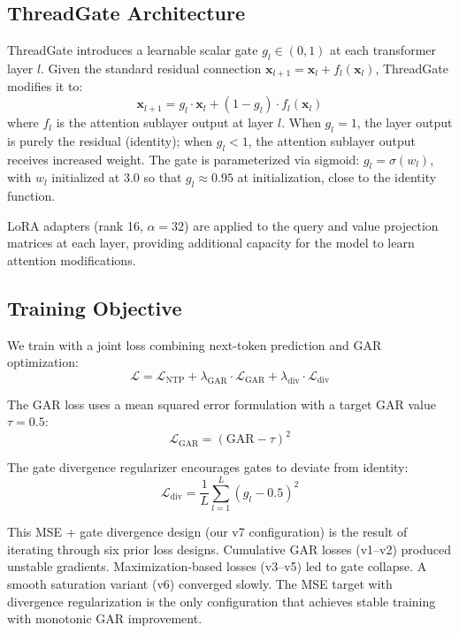 \documentclass[11pt,a4paper]{article}
\begin{document}
\subsection{ThreadGate Architecture}

ThreadGate introduces a learnable scalar gate $g_l \in (0, 1)$ at each transformer layer $l$. Given the standard residual connection $\mathbf{x}_{l+1} = \mathbf{x}_l + f_l(\mathbf{x}_l)$, ThreadGate modifies it to:
\begin{equation}
\mathbf{x}_{l+1} = g_l \cdot \mathbf{x}_l + (1 - g_l) \cdot f_l(\mathbf{x}_l)
\end{equation}
where $f_l$ is the attention sublayer output at layer $l$. When $g_l = 1$, the layer output is purely the residual (identity); when $g_l < 1$, the attention sublayer output receives increased weight. The gate is parameterized via sigmoid: $g_l = \sigma(w_l)$, with $w_l$ initialized at 3.0 so that $g_l \approx 0.95$ at initialization, close to the identity function.

LoRA adapters (rank 16, $\alpha = 32$) are applied to the query and value projection matrices at each layer, providing additional capacity for the model to learn attention modifications.

\subsection{Training Objective}

We train with a joint loss combining next-token prediction and GAR optimization:
\begin{equation}
\mathcal{L} = \mathcal{L}_{\text{NTP}} + \lambda_{\text{GAR}} \cdot \mathcal{L}_{\text{GAR}} + \lambda_{\text{div}} \cdot \mathcal{L}_{\text{div}}
\end{equation}

The GAR loss uses a mean squared error formulation with a target GAR value $\tau = 0.5$:
\begin{equation}
\mathcal{L}_{\text{GAR}} = (\text{GAR} - \tau)^2
\end{equation}

The gate divergence regularizer encourages gates to deviate from identity:
\begin{equation}
\mathcal{L}_{\text{div}} = \frac{1}{L} \sum_{l=1}^{L} (g_l - 0.5)^2
\end{equation}

This MSE + gate divergence design (our v7 configuration) is the result of iterating through six prior loss designs. Cumulative GAR losses (v1--v2) produced unstable gradients. Maximization-based losses (v3--v5) led to gate collapse. A smooth saturation variant (v6) converged slowly. The MSE target with divergence regularization is the only configuration that achieves stable training with monotonic GAR improvement.
\end{document}
